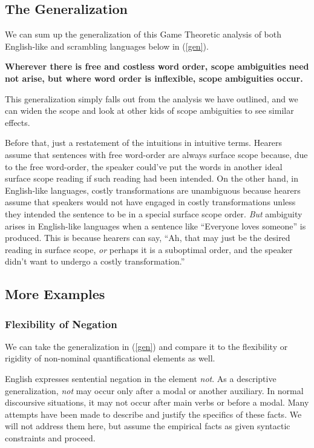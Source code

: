 \documentclass{article}
\begin{document}
\subsection{The Generalization}


We can sum up the generalization of this Game Theoretic analysis of both English-like and scrambling languages below in (\ref{gen}).

\begin{exe}
\ex \textbf{Wherever there is free and costless word order, scope ambiguities need not arise, but where word order is inflexible, scope ambiguities occur.
\label{gen}}
\end{exe}

This generalization simply falls out from the analysis we have outlined, and we can widen the scope and look at other kids of scope ambiguities to see similar effects.

Before that, just a restatement of the intuitions in intuitive terms. Hearers assume that sentences with free word-order are always surface scope because, due to the free word-order, the speaker could've put the words in another ideal surface scope reading if such reading had been intended. On the other hand, in English-like languages, costly transformations are unambiguous because hearers assume that speakers would not have engaged in costly transformations unless they intended the sentence to be in a special surface scope order. \emph{But} ambiguity arises in English-like languages when a sentence like ``Everyone loves someone'' is produced. This is because hearers can say, ``Ah, that may just be the desired reading in surface scope, \emph{or} perhaps it is a suboptimal order, and the speaker didn't want to undergo a costly transformation.''


\subsection{More Examples}

\subsubsection{Flexibility of Negation}

We can take the generalization in (\ref{gen}) and compare it to the flexibility or rigidity of non-nominal quantificational elements as well.

English expresses sentential negation in the element \emph{not}. As a descriptive generalization, \emph{not} may occur only after a modal or another auxiliary. In normal discoursive situations, it may not occur after main verbs or before a modal. Many attempts have been made to describe and justify the specifics of these facts. We will not address them here, but assume the empirical facts as given syntactic constraints and proceed.
\end{document}
